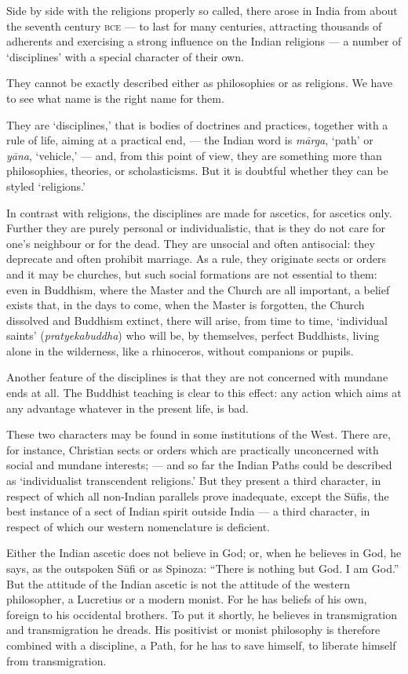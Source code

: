 \documentclass[a4paper, 11pt, oneside, english, landscape]{article}
\begin{document}
Side by side with the religions properly so called, there arose in India from about the seventh century \textsc{bce} --- to last for many centuries, attracting thousands of adherents and exercising a strong influence on the Indian religions --- a number of `disciplines' with a special character of their own.

They cannot be exactly described either as philosophies or as religions. We have to see what name is the right name for them.

They are `disciplines,' that is bodies of doctrines and practices, together with a rule of life, aiming at a practical end, --- the Indian word is \emph{mārga}, `path' or \emph{yāna}, `vehicle,' --- and, from this point of view, they are something more than philosophies, theories, or scholasticisms. But it is doubtful whether they can be styled `religions.'

In contrast with religions, the disciplines are made for ascetics, for ascetics only. Further they are purely personal or individualistic, that is they do not care for one's neighbour or for the dead. They are unsocial and often antisocial: they deprecate and often prohibit marriage. As a rule, they originate sects or orders and it may be churches, but such social formations are not essential to them: even in Buddhism, where the Master and the Church are all important, a belief exists that, in the days to come, when the Master is forgotten, the Church dissolved and Buddhism extinct, there will arise, from time to time, `individual saints' (\emph{pratyekabuddha}) who will be, by themselves, perfect Buddhists, living alone in the wilderness, like a rhinoceros, without companions or pupils.

Another feature of the disciplines is that they are not concerned with mundane ends at all. The Buddhist teaching is clear to this effect: any action which aims at any advantage whatever in the present life, is bad.

These two characters may be found in some institutions of the West. There are, for instance, Christian sects or orders which are practically unconcerned with social and mundane interests; --- and so far the Indian Paths could be described as `individualist transcendent religions.' But they present a third character, in respect of which all non-Indian parallels prove inadequate, except the Sūfis, the best instance of a sect of Indian spirit outside India --- a third character, in respect of which our western nomenclature is deficient.

Either the Indian ascetic does not believe in God; or, when he believes in God, he says, as the outspoken Sūfi or as Spinoza: ``There is nothing but God. I am God.'' But the attitude of the Indian ascetic is not the attitude of the western philosopher, a Lucretius or a modern monist. For he has beliefs of his own, foreign to his occidental brothers. To put it shortly, he believes in transmigration and transmigration he dreads. His positivist or monist philosophy is therefore combined with a discipline, a Path, for he has to save himself, to liberate himself from transmigration.
\end{document}
